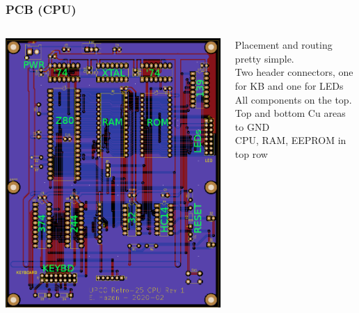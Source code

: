 \documentclass{beamer}
\newcommand{\tblue}[1]{\textcolor{my-blue}{#1}}
\newcommand{\tviolet}[1]{\textcolor{my-violet}{#1}}
\begin{document}
\begin{frame}
  \frametitle{PCB (CPU)}

  \vskip -0.2in
  \scriptsize
  \begin{columns}
    \includegraphics[width=\textwidth]{figs/cpu-board.png}
  
    Placement and routing pretty simple. \\
    Two header connectors, one for KB and one for LEDs \\
    All components on the top.
    \vskip 0.2in
    \tviolet{Top and bottom Cu areas to GND} \\
    \vskip 0.2in
    \tblue CPU, RAM, EEPROM in top row
    \vskip 0.2in
\end{columns}
\end{frame}
\end{document}
